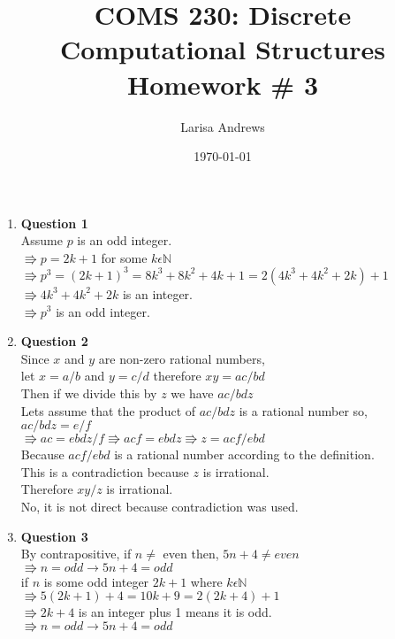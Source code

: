 \documentclass[12pt]{article}
\begin{document}

\title{
\textbf{COMS 230: Discrete Computational Structures}\\
Homework \# 3 \\}
\author{Larisa Andrews}
\date{\today}
\maketitle

\begin{enumerate}

\item {\bf Question 1} \\
	Assume $p$ is an odd integer.\\
	$\Rrightarrow p = 2k+1$ for some $k  \epsilon  \mathbb{N}$ \\
	$\Rrightarrow p^3 = (2k+1)^3 = 8k^3  + 8k^2 + 4k +1 = 2(4k^3 + 4k^2 + 2k)+ 1$ \\
	$\Rrightarrow 4k^3 + 4k^2 + 2k$ is an integer.\\
	$\Rrightarrow p^3$ is an odd integer. \\
	
	
	

\item {\bf Question 2} \\
Since $x$ and $y$ are non-zero rational numbers, \\
let $ x = a/b $ and $y = c/d$ therefore $xy = ac/bd$ \\
Then if we divide this by $z$ we have $ac/bdz$ \\
Lets assume that the product of $ac/bdz$ is a rational number so, \\
$ac/bdz = e/f$ \\
$\Rrightarrow ac = ebdz/f \Rrightarrow acf = ebdz \Rrightarrow z = acf/ebd$\\
Because $acf/ebd$ is a rational number according to the definition. \\
This is a contradiction because $z$ is irrational. \\
Therefore $xy/z$ is irrational.\\
No, it is not direct because contradiction was used. \\
\item {\bf Question 3} \\
By contrapositive, if $n \ne$ even then, $5n+4 \ne even$ \\
$\Rrightarrow n = odd \rightarrow 5n+4 = odd$ \\
if $n$ is some odd integer $2k+1$ where $k \epsilon \mathbb{N}$\\
$\Rrightarrow 5(2k+1) + 4 = 10k +9 = 2(2k+4) + 1$ \\
$\Rrightarrow 2k+4$ is an integer plus 1 means it is odd. \\
$\Rrightarrow n = odd \rightarrow 5n+4 = odd$ \\
    



\end{enumerate}
\end{document}
